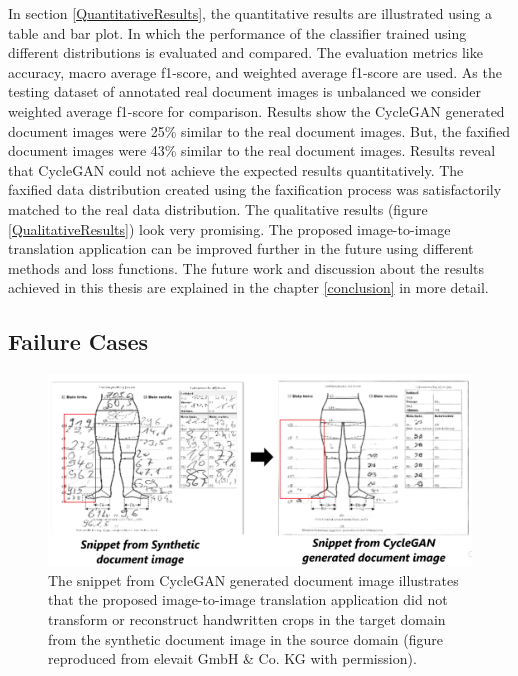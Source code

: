 In section \ref{QuantitativeResults}, the quantitative results are illustrated using a table and bar plot. In which the performance of the classifier trained using different distributions is evaluated and compared. The evaluation metrics like accuracy, macro average f1-score, and weighted average f1-score are used. As the testing dataset of annotated real document images is unbalanced we consider weighted average f1-score for comparison. Results show the \ac{CycleGAN} generated document images were 25\% similar to the real document images. But, the faxified document images were 43\% similar to the real document images. Results reveal that \ac{CycleGAN} could not achieve the expected results quantitatively. The faxified data distribution created using the faxification process was satisfactorily matched to the real data distribution. The qualitative results (figure \ref{QualitativeResults}) look very promising. The proposed image-to-image translation application can be improved further in the future using different methods and loss functions. The future work and discussion about the results achieved in this thesis are explained in the chapter \ref{conclusion} in more detail.



\subsection{Failure Cases}\label{FailureCases}

\begin{figure}[H]
        \begin{center}
	    \includegraphics[scale=0.28]{images/Evaluation/failure1.png}
	    \caption[The snippet from \ac{CycleGAN} generated document image illustrates that the proposed image-to-image translation application did not transform or reconstruct handwritten crops in the target domain from the synthetic document image in the source domain.]{The snippet from \ac{CycleGAN} generated document image illustrates that the proposed image-to-image translation application did not transform or reconstruct handwritten crops in the target domain from the synthetic document image in the source domain (figure reproduced from elevait GmbH \& Co. KG with permission).}
	    \label{fig:failure1}
	    \end{center}
\end{figure}


